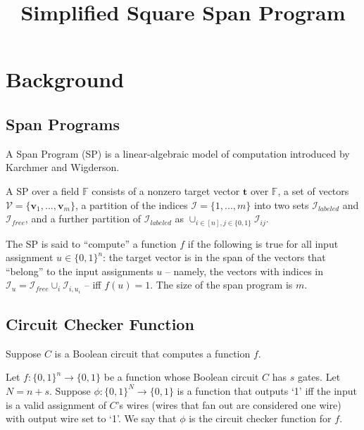 \documentclass[lnbip]{svmultln}
\begin{document}
%

\mainmatter              %
%
\title{Simplified Square Span Program}
%
\author{}%
%
\institute{}%

\maketitle              %
%
\section{Background}
\subsection{Span Programs}
A Span Program (SP) is a linear-algebraic model of computation introduced by Karchmer and Wigderson\cite{gennaro2013quadratic}\cite{karchmer1993span}.
\begin{definition}
 A SP over a field $\mathbb{F}$ consists of a nonzero target vector $\textbf{t}$ over $\mathbb{F}$, a set of vectors $\mathcal{V}=\{\textbf{v}_1,...,\textbf{v}_m\}$, a partition of the indices $\mathcal{I}=\{1,...,m\}$ into two sets $\mathcal{I}_{labeled}$ and $\mathcal{I}_{free}$, and a further partition of $\mathcal{I}_{labeled}$ as $\cup_{i \in [n],j \in \{0,1\}}\mathcal{I}_{ij}$. 
\end{definition}
The SP is said to ``compute'' a function $f$ if the following is true for all input assignment $u \in \{0,1\}^n$: the target vector is in the span of the vectors that ``belong'' to the input assignments $u$ -- namely, the vectors with indices in $\mathcal{I}_u = \mathcal{I}_{free}\cup_i \mathcal{I}_{i,u_i}$ -- iff $f(u)=1$. The size of the span program is $m$.


\subsection{Circuit Checker Function}
Suppose $C$ is a Boolean circuit that computes a function $f$.
\begin{definition}
Let $f:\{0,1\}^n \rightarrow \{0,1\}$ be a function whose Boolean circuit $C$ has $s$ gates. Let $N=n+s$. Suppose $\phi:\{0,1\}^N \rightarrow \{0,1\}$ is a function that outputs `1' iff the input is a valid assignment of $C$'s wires (wires that fan out are considered one wire) with output wire set to `1'. We say that $\phi$ is the circuit checker function for $f$.
\end{definition}
\end{document}
